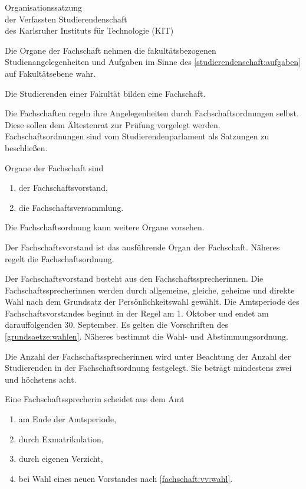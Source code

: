 \begin{jurdoc}[Organisationssatzung]{Organisationssatzung\\der Verfassten Studierendenschaft\\des Karlsruher Instituts für Technologie (KIT)}

%
%


 \label{fachschaften:aufgaben}

Die Organe der Fachschaft nehmen die fakultätsbezogenen Studienangelegenheiten und Aufgaben im Sinne des \ref{studierendenschaft:aufgaben} auf Fakultätsebene wahr.

\label{fachschaften:gliederung}

Die Studierenden einer Fakultät bilden eine Fachschaft.

Die Fachschaften regeln ihre Angelegenheiten durch Fachschaftsordnungen selbst. Diese sollen dem Ältestenrat zur Prüfung vorgelegt werden. Fachschaftsordnungen sind vom Studierendenparlament als Satzungen zu beschließen.



Organe der Fachschaft sind
  \begin{enumerate}
  \item der Fachschaftsvorstand,
  \item die Fachschaftsversammlung.
  \end{enumerate}

Die Fachschaftsordnung kann weitere Organe vorsehen.


\label{fs:vorstand}

Der Fachschaftsvorstand ist das ausführende Organ der Fachschaft. Näheres regelt die Fachschaftsordnung.

Der Fachschaftsvorstand besteht aus den Fach\-schafts\-sprech\-erinnen. Die Fach\-schafts\-sprech\-erinnen werden durch allgemeine, gleiche, geheime und direkte Wahl nach dem Grundsatz der Persönlichkeitswahl gewählt. Die Amtsperiode des Fachschaftsvorstandes beginnt in der Regel am 1. Oktober und endet am darauffolgenden 30. September. Es gelten die Vorschriften des \ref{grundsaetze:wahlen}. Näheres bestimmt die Wahl- und Abstimmungsordnung.

Die Anzahl der Fachschaftssprecherinnen wird unter Beachtung der Anzahl der Studierenden in der Fachschaftsordnung festgelegt. Sie beträgt mindestens zwei und höchstens acht. \label{fs:vorstand:anzahl}

%
%

Eine Fachschaftssprecherin scheidet aus dem Amt
  \begin{enumerate}
  \item am Ende der Amtsperiode,
  \item durch Exmatrikulation,
  \item durch eigenen Verzicht,
  \item bei Wahl eines neuen Vorstandes nach \ref{fachschaft:vv:wahl}.
\end{enumerate}


\end{jurdoc}
